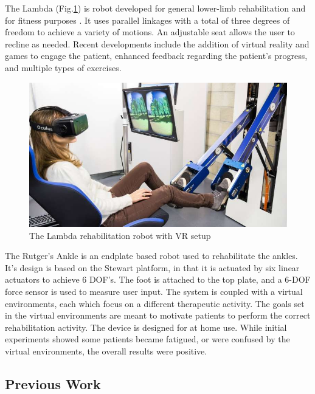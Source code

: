\documentclass[12pt]{report}
\begin{document}
	The Lambda (Fig.\ref{fig:Lambda}) is robot developed for general lower-limb rehabilitation and for fitness purposes \cite{Bouri2009}. It uses parallel linkages with a total of three degrees of freedom to achieve a variety of motions. An adjustable seat allows the user to recline as needed. Recent developments include the addition of virtual reality and games to engage the patient, enhanced feedback regarding the patient's progress, and multiple types of exercises. 
	
	\begin{figure}[t] 
		\centering
		\includegraphics[width=0.75\linewidth]{Lambda}
		\caption{The Lambda rehabilitation robot with VR setup}
		\label{fig:Lambda}
	\end{figure}
	
	The Rutger's Ankle \cite{Burdea2000} is an endplate based robot used to rehabilitate the ankles. It's design is based on the Stewart platform, in that it is actuated by six linear actuators to achieve 6 DOF's. The foot is attached to the top plate, and a 6-DOF force sensor is used to measure user input. The system is coupled with a virtual environments, each which focus on a different therapeutic activity. The goals set in the virtual environments are meant to motivate patients to perform the correct rehabilitation activity. The device is designed for at home use. While initial experiments showed some patients became fatigued, or were confused by the virtual environments, the overall results were positive. 

\subsection{Previous Work} 	
\end{document}
